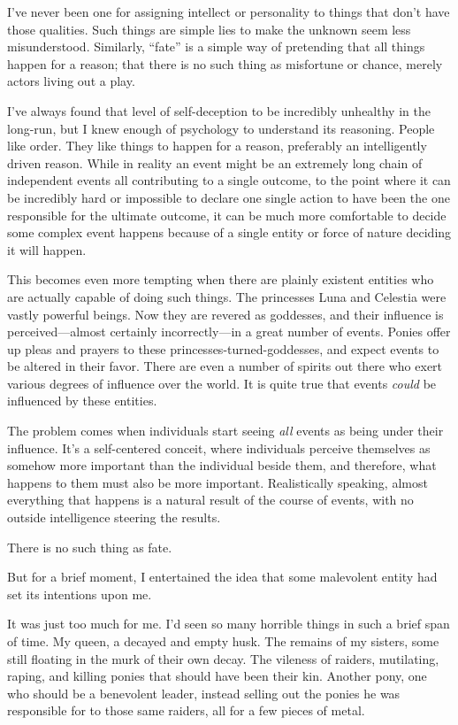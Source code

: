 I’ve never been one for assigning intellect or personality to things that don’t have those qualities. Such things are simple lies to make the unknown seem less misunderstood. Similarly, “fate” is a simple way of pretending that all things happen for a reason; that there is no such thing as misfortune or chance, merely actors living out a play.

I’ve always found that level of self-deception to be incredibly unhealthy in the long-run, but I knew enough of psychology to understand its reasoning. People like order. They like things to happen for a reason, preferably an intelligently driven reason. While in reality an event might be an extremely long chain of independent events all contributing to a single outcome, to the point where it can be incredibly hard or impossible to declare one single action to have been the one responsible for the ultimate outcome, it can be much more comfortable to decide some complex event happens because of a single entity or force of nature deciding it will happen.

This becomes even more tempting when there are plainly existent entities who are actually capable of doing such things. The princesses Luna and Celestia were vastly powerful beings. Now they are revered as goddesses, and their influence is perceived—almost certainly incorrectly—in a great number of events. Ponies offer up pleas and prayers to these princesses-turned-goddesses, and expect events to be altered in their favor. There are even a number of spirits out there who exert various degrees of influence over the world. It is quite true that events \textit{could} be influenced by these entities.

The problem comes when individuals start seeing \textit{all} events as being under their influence. It’s a self-centered conceit, where individuals perceive themselves as somehow more important than the individual beside them, and therefore, what happens to them must also be more important. Realistically speaking, almost everything that happens is a natural result of the course of events, with no outside intelligence steering the results.

There is no such thing as fate.

But for a brief moment, I entertained the idea that some malevolent entity had set its intentions upon me.

It was just too much for me. I’d seen so many horrible things in such a brief span of time. My queen, a decayed and empty husk. The remains of my sisters, some still floating in the murk of their own decay. The vileness of raiders, mutilating, raping, and killing ponies that should have been their kin. Another pony, one who should be a benevolent leader, instead selling out the ponies he was responsible for to those same raiders, all for a few pieces of metal.

